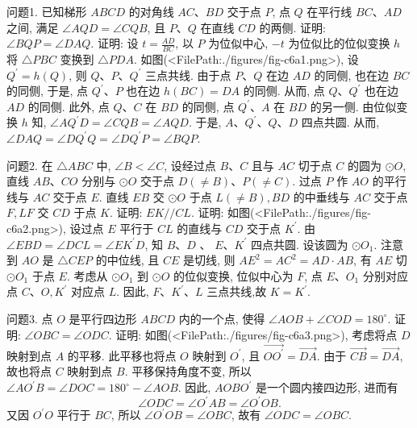 
问题1. 已知梯形 $A B C D$ 的对角线 $A C 、 B D$ 交于点 $P$, 点 $Q$ 在平行线 $B C 、 A D$ 之间, 满足 $\angle A Q D=\angle C Q B$, 且 $P 、 Q$ 在直线 $C D$ 的两侧.
证明: $\angle B Q P=\angle D A Q$.
证明: 设 $t=\frac{A D}{B C}$, 以 $P$ 为位似中心, $-t$ 为位似比的位似变换 $h$ 将 $\triangle P B C$ 变换到 $\triangle P D A$.
如图(<FilePath:./figures/fig-c6a1.png>), 设 $Q^{\prime}=h(Q)$, 则 $Q 、 P 、 Q^{\prime}$ 三点共线.
由于点 $P 、 Q$ 在边 $A D$ 的同侧, 也在边 $B C$ 的同侧, 于是, 点 $Q^{\prime} 、 P$ 也在边 $h(B C)=D A$ 的同侧.
从而, 点 $Q 、 Q^{\prime}$ 也在边 $A D$ 的同侧.
此外, 点 $Q 、 C$
在 $B D$ 的同侧, 点 $Q^{\prime} 、 A$ 在 $B D$ 的另一侧.
由位似变换 $h$ 知, $\angle A Q^{\prime} D= \angle C Q B=\angle A Q D$. 于是, $A 、 Q^{\prime} 、 Q 、 D$ 四点共圆.
从而, $\angle D A Q=\angle D Q^{\prime} Q= \angle D Q^{\prime} P=\angle B Q P$.



问题2. 在 $\triangle A B C$ 中, $\angle B<\angle C$, 设经过点 $B 、 C$ 且与 $A C$ 切于点 $C$ 的圆为 $\odot O$, 直线 $A B 、 C O$ 分别与 $\odot O$ 交于点 $D(\neq B) 、 P(\neq C)$. 过点 $P$ 作 $A O$ 的平行线与 $A C$ 交于点 $E$. 直线 $E B$ 交 $\odot O$ 于点 $L(\neq B), B D$ 的中垂线与 $A C$ 交于点 $F, L F$ 交 $C D$ 于点 $K$. 证明: $E K / / C L$.
证明: 如图(<FilePath:./figures/fig-c6a2.png>), 设过点 $E$ 平行于 $C L$ 的直线与 $C D$ 交于点 $K^{\prime}$.
由 $\angle E B D=\angle D C L=\angle E K^{\prime} D$, 知 $B 、 D$ 、 $E 、 K^{\prime}$ 四点共圆.
设该圆为 $\odot O_1$. 注意到 $A O$ 是 $\triangle C E P$ 的中位线, 且 $C E$ 是切线, 则 $A E^2= A C^2=A D \cdot A B$, 有 $A E$ 切 $\odot O_1$ 于点 $E$. 考虑从 $\odot O_1$ 到 $\odot O$ 的位似变换, 位似中心为 $F$, 点 $E 、 O_1$ 分别对应点 $C 、 O, K^{\prime}$ 对应点 $L$. 因此, $F 、 K^{\prime} 、 L$ 三点共线,故 $K=K^{\prime}$.



问题3. 点 $O$ 是平行四边形 $A B C D$ 内的一个点, 使得 $\angle A O B+\angle C O D=180^{\circ}$. 证明: $\angle O B C=\angle O D C$.
证明: 如图(<FilePath:./figures/fig-c6a3.png>), 考虑将点 $D$ 映射到点 $A$ 的平移.
此平移也将点 $O$ 映射到 $O^{\prime}$, 且 $\overrightarrow{O O^{\prime}}=\overrightarrow{D A}$. 由于 $\overrightarrow{C B}=\overrightarrow{D A}$, 故也将点 $C$ 映射到点 $B$.
平移保持角度不变, 所以 $\angle A O^{\prime} B=\angle D O C= 180^{\circ}-\angle A O B$.
因此, $A O B O^{\prime}$ 是一个圆内接四边形, 进而有
$$
\angle O D C=\angle O^{\prime} A B=\angle O^{\prime} O B .
$$
又因 $O^{\prime} O$ 平行于 $B C$, 所以 $\angle O^{\prime} O B=\angle O B C$, 故有
$\angle O D C=\angle O B C$.



